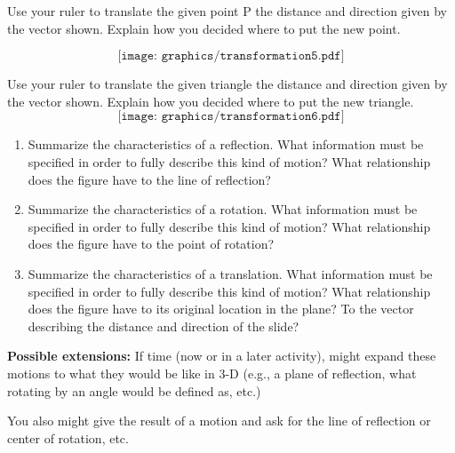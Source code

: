 \documentclass[handout]{ximera}
\begin{document}
\begin{problem}
Use your ruler to translate the given point P the distance and direction given by the vector shown.  Explain how you decided where to put the new point.\\
\vskip 1.5in

\[
\texttt{[image: graphics/transformation5.pdf]}
\]
\vfill
\end{problem}
\newpage

\begin{problem}
Use your ruler to translate the given triangle the distance and direction given by the vector shown.  Explain how you decided where to put the new triangle.\\
\vskip 1.5in
\[
\texttt{[image: graphics/transformation6.pdf]}
\]
\vfill
\end{problem}
\newpage

\begin{problem}
\begin{enumerate}
    \item Summarize the characteristics of a reflection.  What information must be specified in order to fully describe this kind of motion?  What relationship does the figure have to the line of reflection?
    \item Summarize the characteristics of a rotation.  What information must be specified in order to fully describe this kind of motion?  What relationship does the figure have to the point of rotation?
    \item Summarize the characteristics of a translation.  What information must be specified in order to fully describe this kind of motion?  What relationship does the figure have to its original location in the plane? To the vector describing the distance and direction of the slide?
\end{enumerate}

\begin{instructorNotes}
{\bf Possible extensions:} If time (now or in a later activity), might expand these motions to what they would be like in 3-D (e.g., a plane of reflection, what rotating by an angle would be defined as, etc.)

You also might give the result of a motion and ask for the line of reflection or center of rotation, etc.
\end{instructorNotes}
\end{problem}
\end{document}

